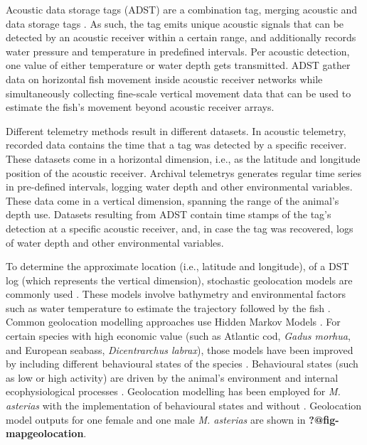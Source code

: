\documentclass[
  authoryear,
  review,
  3p]{elsarticle}
\begin{document}
Acoustic data storage tags (ADST) are a combination tag, merging
acoustic and data storage tags \citep{goossens_2023}. As such, the tag
emits unique acoustic signals that can be detected by an acoustic
receiver within a certain range, and additionally records water pressure
and temperature in predefined intervals. Per acoustic detection, one
value of either temperature or water depth gets transmitted. ADST gather
data on horizontal fish movement inside acoustic receiver networks while
simultaneously collecting fine-scale vertical movement data that can be
used to estimate the fish's movement beyond acoustic receiver arrays.

Different telemetry methods result in different datasets. In acoustic
telemetry, recorded data contains the time that a tag was detected by a
specific receiver. These datasets come in a horizontal dimension, i.e.,
as the latitude and longitude position of the acoustic receiver.
Archival telemetrys generates regular time series in pre-defined
intervals, logging water depth and other environmental variables. These
data come in a vertical dimension, spanning the range of the animal's
depth use. Datasets resulting from ADST contain time stamps of the tag's
detection at a specific acoustic receiver, and, in case the tag was
recovered, logs of water depth and other environmental variables.

To determine the approximate location (i.e., latitude and longitude), of
a DST log (which represents the vertical dimension), stochastic
geolocation models are commonly used \citep{gatti_2021}. These models
involve bathymetry and environmental factors such as water temperature
to estimate the trajectory followed by the fish \citep{nielsen_2004}.
Common geolocation modelling approaches use Hidden Markov Models
\citep[HMM,][]{pedersen_2008, woillez_2016}. For certain species with
high economic value (such as Atlantic cod, \emph{Gadus morhua}, and
European seabass, \emph{Dicentrarchus labrax}), those models have been
improved by including different behavioural states of the species
\citep{pedersen_2008, heerah_2017}. Behavioural states (such as low or
high activity) are driven by the animal's environment and internal
ecophysiological processes \citep{gurarie_2016}. Geolocation modelling
has been employed for \emph{M. asterias} with the implementation of
behavioural states \citep[following the approach of][]{pedersen_2008}
and without \citep[following the approach of
\citet{woillez_2016}]{goossens_2023}. Geolocation model outputs for one
female and one male \emph{M. asterias} are shown in
\textbf{?@fig-mapgeolocation}.
\end{document}

